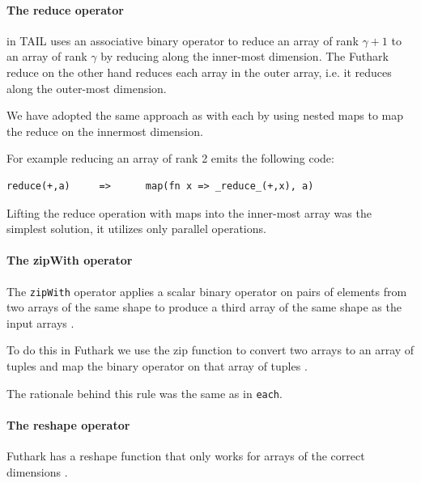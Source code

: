\documentclass[11pt]{article}
\begin{document}
\paragraph{The reduce operator}

in TAIL uses an associative binary operator to reduce an array of rank
$\gamma+1$ to an array of rank $\gamma$ by reducing along the inner-most dimension\cite{ElsmanDybdal:Array:2014}.
The Futhark reduce on the other hand reduces each array in the outer array, i.e. it reduces along the outer-most dimension\cite{TroelsHenriksen}.
 
We have adopted the same approach as with each by using nested maps to map the reduce on the innermost dimension.
 
For example reducing an array of rank 2 emits the following code:
 
\begin{lstlisting}[numbers=none,frame=none]
reduce(+,a)     =>      map(fn x => _reduce_(+,x), a)
\end{lstlisting}

Lifting the reduce operation with maps into the inner-most array was the simplest solution, it utilizes only parallel operations.

\paragraph{The zipWith operator}
The {\tt zipWith} operator applies a scalar binary operator on pairs of elements from two arrays of the same shape to
produce a third array of the same shape as the input arrays \cite{ElsmanDybdal:Array:2014}.
 
To do this in Futhark we use the zip function to convert two arrays to an array of tuples and map the binary operator on that array of tuples \cite{TroelsHenriksen}.

The rationale behind this rule was the same as in {\tt each}.

\paragraph{The reshape operator} 
Futhark has a reshape function that only works for arrays of the correct dimensions \cite{TroelsHenriksen}.
\end{document}
